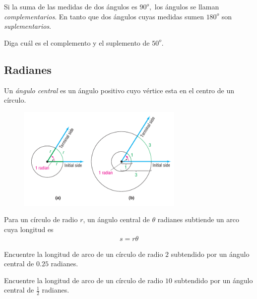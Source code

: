 {}
	Si la suma de las medidas de  dos ángulos es $90^{o},$ los ángulos se llaman \emph{complementarios}. En tanto que dos ángulos cuyas medidas sumen $180^{o}$ son \emph{suplementarios}.

{}
	\begin{problema}
		\label{exmp:1011}
		Diga cuál es el complemento y el suplemento de $50^{o}$.
	\end{problema}
	

\subsection{Radianes}
{}
	Un \emph{ángulo central} es un ángulo positivo cuyo vértice esta en el centro de un círculo. 

{}
	\begin{figure}[h]
		\centering
		\includegraphics[height=5cm,keepaspectratio=true]{./trig/sull0610.png}
		\label{fig:sull6110}
	\end{figure}
	

{}
	\begin{thm}
		Para un círculo de radio $r$, un ángulo central  de $\theta$ radianes subtiende un arco cuya longitud es 
		\begin{align}
			\label{sull6104}
			s = r\theta
		\end{align}
	\end{thm}
	

{}
	\begin{problema}
		\label{exmp:sull6103}
		Encuentre la longitud de arco de un círculo de radio $2$ subtendido por un ángulo central de $0.25$ radianes. 
	\end{problema}

{}
	\begin{problema}
		\label{exe:sull6171}
		Encuentre la longitud de arco de un círculo de radio $10$ subtendido por un ángulo central de $\frac{1}{2}$ radianes. 
	\end{problema}
	

